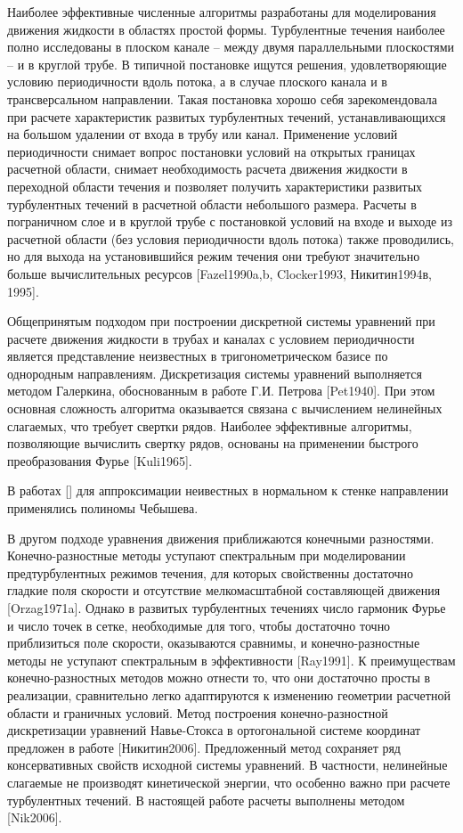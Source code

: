 Наиболее эффективные численные алгоритмы разработаны для моделирования движения жидкости в областях простой формы. Турбулентные течения наиболее полно исследованы в плоском канале -- между двумя параллельными плоскостями -- и в круглой трубе. В типичной постановке ищутся решения, удовлетворяющие условию периодичности вдоль потока, а в случае плоского канала и в трансверсальном направлении. Такая постановка хорошо себя зарекомендовала при расчете характеристик развитых турбулентных течений, устанавливающихся на большом удалении от входа в трубу или канал. Применение условий периодичности снимает вопрос постановки условий на открытых границах расчетной области, снимает необходимость расчета движения жидкости в переходной области течения и позволяет получить характеристики развитых турбулентных течений в расчетной области небольшого размера. Расчеты в пограничном слое и в круглой трубе с постановкой условий на входе и выходе из расчетной области (без условия периодичности вдоль потока) также проводились, но для выхода на установившийся режим течения они требуют значительно больше вычислительных ресурсов [Fazel1990a,b, Clocker1993, Никитин1994в, 1995]. 

Общепринятым подходом при построении дискретной системы уравнений при расчете движения жидкости в трубах и каналах с условием периодичности является представление неизвестных в тригонометрическом базисе по однородным направлениям. Дискретизация системы уравнений выполняется методом Галеркина, обоснованным в работе Г.И. Петрова [Pet1940]. При этом основная сложность алгоритма оказывается связана с вычислением нелинейных слагаемых, что требует свертки рядов. Наиболее эффективные алгоритмы, позволяющие вычислить свертку рядов, основаны на применении быстрого преобразования Фурье [Kuli1965]. 

В работах [] для аппроксимации неивестных в нормальном к стенке направлении применялись полиномы Чебышева. 

В другом подходе уравнения движения приближаются конечными разностями. Конечно-разностные методы уступают спектральным при моделировании предтурбулентных режимов течения, для которых свойственны достаточно гладкие поля скорости и отсутствие мелкомасштабной составляющей движения [Orzag1971a]. Однако в развитых турбулентных течениях число гармоник Фурье и число точек в сетке, необходимые для того, чтобы достаточно точно приблизиться поле скорости, оказываются сравнимы, и конечно-разностные методы не уступают спектральным в эффективности [Ray1991]. К преимуществам конечно-разностных методов можно отнести то, что они достаточно просты в реализации, сравнительно легко адаптируются к изменению геометрии расчетной области и граничных условий. Метод построения конечно-разностной дискретизации уравнений Навье-Стокса в ортогональной системе координат предложен в работе [Никитин2006]. Предложенный метод сохраняет ряд консервативных свойств исходной системы уравнений. В частности, нелинейные слагаемые не производят кинетической энергии, что особенно важно при расчете турбулентных течений. В настоящей работе расчеты выполнены методом [Nik2006]. 


